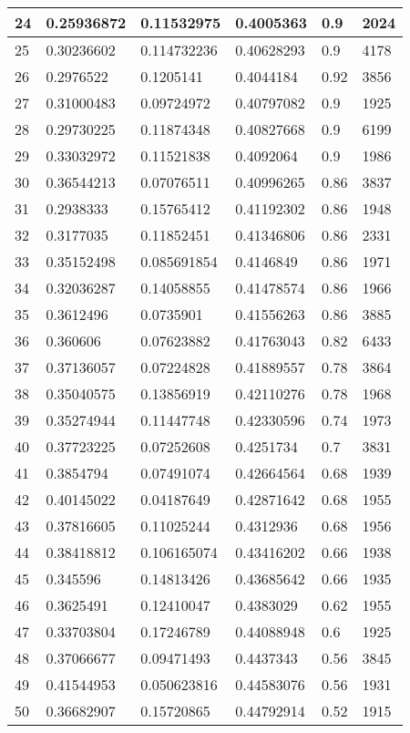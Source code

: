 \begin{longtable}{|l|l|l|l|l|l|}
24 & 0.25936872 & 0.11532975 & 0.4005363 & 0.9 & 2024 \\ \hline 
25 & 0.30236602 & 0.114732236 & 0.40628293 & 0.9 & 4178 \\ \hline 
26 & 0.2976522 & 0.1205141 & 0.4044184 & 0.92 & 3856 \\ \hline 
27 & 0.31000483 & 0.09724972 & 0.40797082 & 0.9 & 1925 \\ \hline 
28 & 0.29730225 & 0.11874348 & 0.40827668 & 0.9 & 6199 \\ \hline 
29 & 0.33032972 & 0.11521838 & 0.4092064 & 0.9 & 1986 \\ \hline 
30 & 0.36544213 & 0.07076511 & 0.40996265 & 0.86 & 3837 \\ \hline 
31 & 0.2938333 & 0.15765412 & 0.41192302 & 0.86 & 1948 \\ \hline 
32 & 0.3177035 & 0.11852451 & 0.41346806 & 0.86 & 2331 \\ \hline 
33 & 0.35152498 & 0.085691854 & 0.4146849 & 0.86 & 1971 \\ \hline 
34 & 0.32036287 & 0.14058855 & 0.41478574 & 0.86 & 1966 \\ \hline 
35 & 0.3612496 & 0.0735901 & 0.41556263 & 0.86 & 3885 \\ \hline 
36 & 0.360606 & 0.07623882 & 0.41763043 & 0.82 & 6433 \\ \hline 
37 & 0.37136057 & 0.07224828 & 0.41889557 & 0.78 & 3864 \\ \hline 
38 & 0.35040575 & 0.13856919 & 0.42110276 & 0.78 & 1968 \\ \hline 
39 & 0.35274944 & 0.11447748 & 0.42330596 & 0.74 & 1973 \\ \hline 
40 & 0.37723225 & 0.07252608 & 0.4251734 & 0.7 & 3831 \\ \hline 
41 & 0.3854794 & 0.07491074 & 0.42664564 & 0.68 & 1939 \\ \hline 
42 & 0.40145022 & 0.04187649 & 0.42871642 & 0.68 & 1955 \\ \hline 
43 & 0.37816605 & 0.11025244 & 0.4312936 & 0.68 & 1956 \\ \hline 
44 & 0.38418812 & 0.106165074 & 0.43416202 & 0.66 & 1938 \\ \hline 
45 & 0.345596 & 0.14813426 & 0.43685642 & 0.66 & 1935 \\ \hline 
46 & 0.3625491 & 0.12410047 & 0.4383029 & 0.62 & 1955 \\ \hline 
47 & 0.33703804 & 0.17246789 & 0.44088948 & 0.6 & 1925 \\ \hline 
48 & 0.37066677 & 0.09471493 & 0.4437343 & 0.56 & 3845 \\ \hline 
49 & 0.41544953 & 0.050623816 & 0.44583076 & 0.56 & 1931 \\ \hline 
50 & 0.36682907 & 0.15720865 & 0.44792914 & 0.52 & 1915 \\ \hline 
\end{longtable}